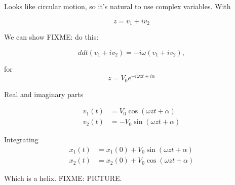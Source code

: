 Looks like circular motion, so it's natural to use complex variables.  With

\begin{equation}\label{eqn:relativisticElectrodynamicsT3:740}
z = v_1 + i v_2 
\end{equation}

We can show
FIXME: do this:

\begin{equation}\label{eqn:relativisticElectrodynamicsT3:760}
ddt ( v_1 + i v_2 ) = -i \omega ( v_1 + i v_2 ),
\end{equation}

for
\begin{equation}\label{eqn:relativisticElectrodynamicsT3:780}
z = V_0 e^{-i \omega z t + i \alpha}
\end{equation}

Real and imaginary parts

\begin{align}\label{eqn:relativisticElectrodynamicsT3:800}
v_1(t) &= V_0 \cos( \omega z t + \alpha) \\
v_2(t) &= -V_0 \sin( \omega z t + \alpha)
\end{align}

Integrating
\begin{align}\label{eqn:relativisticElectrodynamicsT3:820}
x_1(t) &= x_1(0) + V_0 \sin( \omega z t + \alpha) \\
x_2(t) &= x_2(0) + V_0 \cos( \omega z t + \alpha)
\end{align}

Which is a helix.
FIXME: PICTURE.

\EndNoBibArticle
